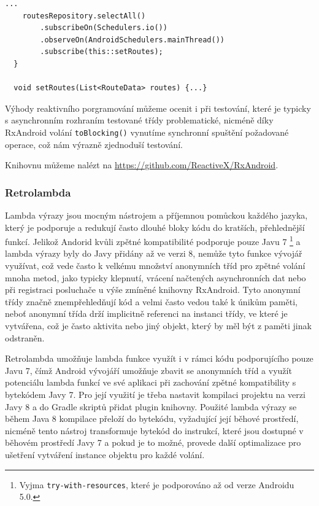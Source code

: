 \documentclass{article}
\begin{document}
\begin{lstlisting}[label=rxmainthreaddeliver,caption=Reakce na událost v UI vlákně pomocí RxAndorid]
    ...
    routesRepository.selectAll()
        .subscribeOn(Schedulers.io())
        .observeOn(AndroidSchedulers.mainThread())
        .subscribe(this::setRoutes);
  }

  void setRoutes(List<RouteData> routes) {...}
\end{lstlisting}

Výhody reaktivního porgramování můžeme ocenit i při testování, které je typicky s asynchronním
rozhraním testované třídy problematické, nicméně díky RxAndroid volání \texttt{toBlocking()} vynutíme
synchronní spuštění požadované operace, což nám výrazně zjednoduší testování.

Knihovnu můžeme nalézt na \url{https://github.com/ReactiveX/RxAndroid}.

\subsubsection{Retrolambda}
Lambda výrazy jsou mocným nástrojem a příjemnou pomůckou každého jazyka, který je podporuje a redukují
často dlouhé bloky kódu do kratších, přehlednější funkcí. Jelikož Andorid kvůli zpětné
kompatibilité podporuje pouze Javu 7
\footnote{Vyjma \texttt{try-with-resources}, které je podporováno až od verze Androidu 5.0.}
a lambda výrazy byly do Javy přidány až ve verzi 8, nemůže tyto funkce vývojář využívat,
což vede často k velkému množství anonymních tříd pro zpětné volání mnoha metod, jako typicky klepnutí,
vrácení načtených asynchronních dat nebo při registraci posluchače u výše zmíněné knihovny RxAndroid.
Tyto anonymní třídy značně znempřehledňují kód a velmi často vedou také k únikům paměti,
neboť anonymní třída drží implicitně referenci na instanci třídy, ve které je vytvářena, což je často
aktivita nebo jiný objekt, který by měl být z paměti jinak odstraněn.

Retrolambda umožňuje lambda funkce využít i v rámci kódu podporujícího pouze Javu 7,
čímž Android vývojáří umožňuje zbavit se anonymních tříd a využít potenciálu lambda funkcí
ve své aplikaci při zachování zpětné kompatibility s bytekódem Javy 7. Pro její využití je třeba
nastavit kompilaci projektu na verzi Javy 8 a do Gradle skriptů přidat plugin knihovny. Použité
lambda výrazy se během Java 8 kompilace přeloží do bytekódu, vyžadující její běhové prostředí,
nicméně tento nástroj transformuje bytekód do instrukcí, které jsou dostupné v běhovém prostředí
Javy 7 a pokud je to možné, provede další optimalizace pro ušetření vytváření instance objektu
pro každé volání.
\end{document}
